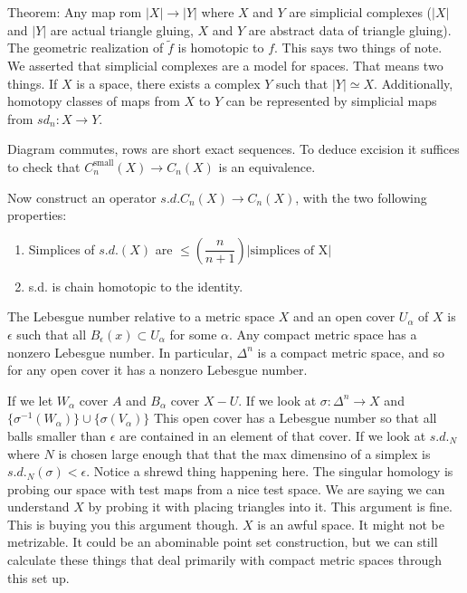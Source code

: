 \documentclass[12pt]{article}
\theoremstyle{definition}
\begin{document}
	Theorem: Any map rom $|X|\to |Y|$ where $X$ and $Y$ are simplicial complexes ($|X|$ and $|Y|$ are actual triangle gluing, $X$ and $Y$ are abstract data of triangle gluing). The geometric realization of $\tilde f$ is homotopic to $f$. This says two things of note. We asserted that simplicial complexes are a model for spaces. That means two things. If $X$ is a space, there exists a complex $Y$ such that $|Y|\simeq X$. Additionally, homotopy classes of maps from $X$ to $Y$ can be represented by simplicial maps from $sd_n: X\to Y$. 
	\begin{center}
	\end{center}
	Diagram commutes, rows are short exact sequences. To deduce excision it suffices to check that $C_n^{\text{small}}(X)\to C_n(X)$ is an equivalence. 
	
	Now construct an operator $s.d.C_n(X)\to C_n(X)$, with the two following properties:
	\begin{enumerate}
		\item Simplices of $s.d.(X)$ are $\leq \left(\dfrac{n}{n+1}\right)\left|\text{simplices of X}\right|$ 
		\item  s.d. is chain homotopic to the identity.
	\end{enumerate}
	The Lebesgue number relative to a metric space $X$ and an open cover $U_\alpha$ of $X$ is $\epsilon$ such that all $B_\epsilon(x)\subset U_\alpha$ for some $\alpha$. Any compact metric space has a nonzero Lebesgue number. In particular, $\Delta^n$ is a compact metric space, and so for any open cover it has a nonzero Lebesgue number. 
	
	If we let $W_\alpha$ cover $A$ and $B_\alpha$ cover $X-U$. If we look at $\sigma:\Delta^n\to X$ and $\{\sigma^{-1}(W_\alpha)\}\cup \{\sigma(V_\alpha)\}$ This open cover has a Lebesgue number so that all balls smaller than $\epsilon$ are contained in an element of that cover. If we look at $s.d._N$ where $N$ is chosen large enough that that the max dimensino of a simplex is $s.d._N(\sigma)<\epsilon$. Notice a shrewd thing happening here. The singular homology is probing our space with test maps from a nice test space. We are saying we can understand $X$ by probing it with placing triangles into it. This argument is fine. This is buying you this argument though. $X$ is an awful space. It might not be metrizable. It could be an abominable point set construction, but we can still calculate these things that deal primarily with compact metric spaces through this set up. 
	
\end{document}
